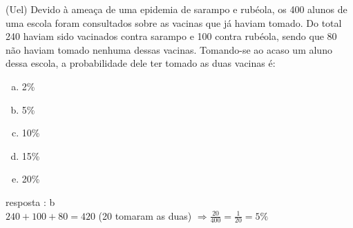 \begin{ex}
(Uel) Devido à ameaça de uma epidemia de sarampo e rubéola, os 400 alunos de uma escola foram consultados sobre as vacinas que já haviam tomado. Do total 240 haviam sido vacinados contra sarampo e 100 contra rubéola, sendo que 80 não haviam tomado nenhuma dessas vacinas. Tomando-se ao acaso um aluno dessa escola, a probabilidade dele ter tomado as duas vacinas é:
   \begin{enumerate}[(a)]
   \item 2\%
   \item 5\%
   \item 10\%
   \item 15\%
   \item 20\%
   \end{enumerate}
     \begin{sol}
      resposta : b \\
      $240+100+80=420$ \hspace{0,3cm} (20 tomaram as duas)
      $\Longrightarrow \frac{20}{400}=\frac{1}{20}=5\%$
     \end{sol}
\end{ex}